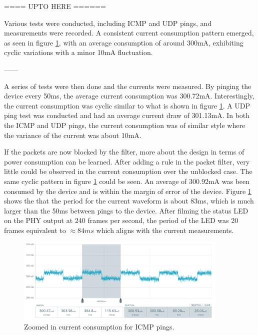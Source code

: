 ==== UPTO HERE ======



Various tests were conducted, including ICMP and UDP pings, and measurements were recorded. A consistent current consumption pattern emerged, as seen in figure \ref{fig:ppk_icmp_ping}, with an average consumption of around 300mA, exhibiting cyclic variations with a minor 10mA fluctuation.



------


A series of tests were then done and the currents were measured. By pinging the device every 50ms, the average current consumption was 300.72mA. Interestingly, the current consumption was cyclic similar to what is shown in figure \ref{fig:ppk_icmp_ping}. A UDP ping test was conducted and had an average current draw of 301.13mA. In both the ICMP and UDP pings, the current consumption was of similar style where the variance of the current was about 10mA. 


If the packets are now blocked by the filter, more about the design in terms of power consumption can be learned. After adding a rule in the packet filter, very little could be observed in the current consumption over the unblocked case. The same cyclic pattern in figure \ref{fig:ppk_icmp_ping} could be seen. An average of 300.92mA was been consumed by the device and is within the margin of error of the device. Figure \ref{fig:ppk_icmp_ping} shows the that the period for the current waveform is about 83ms, which is much larger than the 50ms between pings to the device. After filming the status LED on the PHY output at 240 frames per second, the period of the LED was 20 frames equivalent to $\approx 84ms$ which aligns with the current measurements. 












\begin{figure}[h]
    \centering
    \includegraphics[width=0.9\textwidth]{Images/PPK_ping_zoom.png}
    \caption[Zoomed in current consumption for ICMP pings]{Zoomed in current consumption for ICMP pings.}
    \label{fig:ppk_icmp_ping}
\end{figure}



